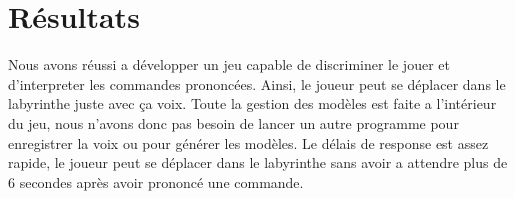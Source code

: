 \section{Résultats}
\label{sec:resultats}

Nous avons réussi a développer un jeu capable de discriminer le jouer et d'interpreter les commandes prononcées.
Ainsi, le joueur peut se déplacer dans le labyrinthe juste avec ça voix. Toute la gestion des modèles est faite a l'intérieur du jeu,
nous n'avons donc pas besoin de lancer un autre programme pour enregistrer la voix ou pour générer les modèles.
Le délais de response est assez rapide, le joueur peut se déplacer dans le labyrinthe sans avoir a attendre plus de 6 secondes
après avoir prononcé une commande.

